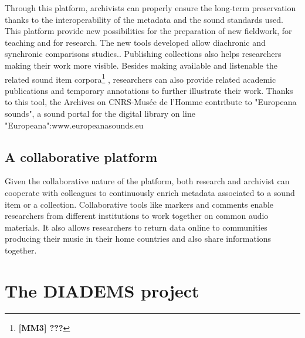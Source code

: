 \documentclass{sig-alternate}
\newcommand{\comment}[1]{\footnote{\color{red} \bf{{#1}}}}
\begin{document}
Through this platform, archivists can properly ensure the long-term preservation thanks to the interoperability of the metadata and the sound standards used.
This platform provide new possibilities for the preparation of new fieldwork, for teaching and for research. The new tools developed allow diachronic and synchronic comparisons studies..
Publishing collections also helps researchers making their work more visible. Besides making available and listenable the related sound item corpora\comment{[MM3] ???} , researchers can also provide related academic publications and temporary annotations to further illustrate their work.
Thanks to this tool, the Archives on CNRS-Musée de l'Homme contribute to "Europeana sounds", a sound portal for the digital library on line "Europeana":www.europeanasounds.eu
\subsection{A collaborative platform}
Given the collaborative nature of the platform, both research and archivist can cooperate with colleagues to continuously enrich metadata associated to a sound item or a collection.  
Collaborative tools like markers and comments enable researchers from different institutions to work together on common audio materials.
It also allows researchers to return data online to communities producing their music in their home countries and also share informations together.

\section{The DIADEMS project}
\end{document}
